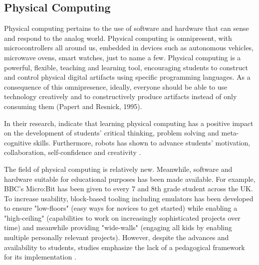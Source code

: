 \subsection{Physical Computing}


Physical computing pertains to the use of software and hardware that can sense and respond to the analog world. Physical computing is omnipresent, with microcontrollers all around us, embedded in devices such as autonomous vehicles, microwave ovens, smart watches, just to name a few. Physical computing is a powerful, flexible, teaching and learning tool, encouraging students to construct and control physical digital artifacts using specific programming languages. As a consequence of this omnipresence, ideally, everyone should be able to use technology creatively and to constructively produce artifacts instead of only consuming them (Papert and Resnick, 1995).


In their research,  indicate that learning physical computing has a positive impact on the development of students'
critical thinking, problem solving and meta-cognitive skills. Furthermore, robots has shown to advance students' motivation, collaboration, self-confidence and
creativity \cite{miller2008robots}.


The field of physical computing is relatively new. Meanwhile, software and hardware suitable for educational purposes has been made available. For example, BBC's Micro:Bit has been given to every 7 and 8th grade student across the UK. To increase usability, block-based tooling including emulators has been developed to ensure "low-floors" (easy ways for novices to get started) while enabling a "high-ceiling" (capabilities to work on increasingly sophisticated projects over time) and meanwhile providing "wide-walls" (engaging all kids by enabling multiple personally relevant projects). However, despite the advances and availability to students, studies emphasize the lack of a pedagogical framework for its implementation \cite{atmatzidou2012evaluating}.




